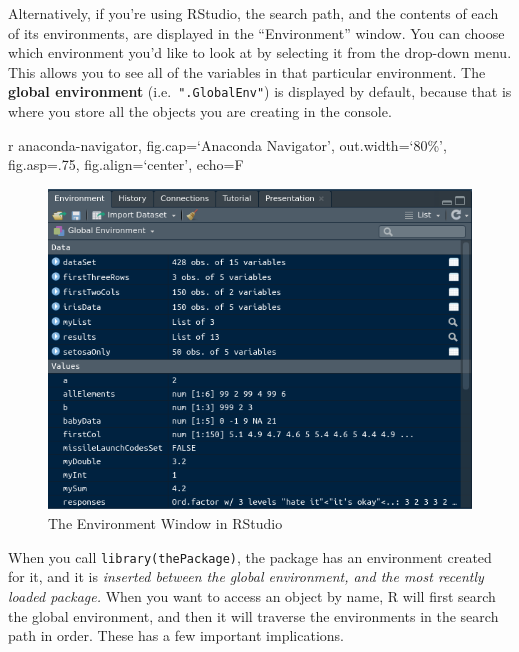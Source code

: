 \documentclass[
  12pt,
]{krantz}
\begin{document}
Alternatively, if you're using RStudio, the search path, and the contents of each of its environments, are displayed in the ``Environment'' window. You can choose which environment you'd like to look at by selecting it from the drop-down menu. This allows you to see all of the variables in that particular environment. The \textbf{global environment} (i.e.~\texttt{".GlobalEnv"}) is displayed by default, because that is where you store all the objects you are creating in the console.

r anaconda-navigator, fig.cap=`Anaconda Navigator', out.width=`80\%', fig.asp=.75, fig.align=`center', echo=F

\begin{figure}

{\centering \includegraphics[width=0.8\linewidth]{pics/environments_display_rstudio} 

}

\caption{The Environment Window in RStudio}\label{fig:rstudiodisp}
\end{figure}

When you call \texttt{library(thePackage)}, the package has an environment created for it, and it is \emph{inserted between the global environment, and the most recently loaded package.} When you want to access an object by name, R will first search the global environment, and then it will traverse the environments in the search path in order. These has a few important implications.
\end{document}
